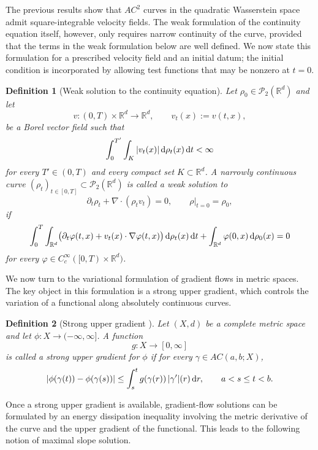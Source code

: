 \documentclass[11pt,reqno]{amsart}
\numberwithin{figure}{section}
\def\d {{\partial}}
\def\d{\mathrm{d}}
\renewcommand{\d}{  {\textup{d}} }
\newtheorem{definition}{Definition}[section]
\begin{document}
The previous results show that $AC^2$ curves in the quadratic Wasserstein space admit square-integrable velocity fields. The weak formulation of the continuity equation itself, however, only requires narrow continuity of the curve, provided that the terms in the weak formulation below are well defined. We now state this formulation for a prescribed velocity field and an initial datum; the initial condition is incorporated by allowing test functions that may be nonzero at $t=0$.

\begin{definition}[Weak solution to the continuity equation] \label{def:weak-solution} 
Let $\rho_0\in\mathcal P_2(\mathbb R^d)$ and let 
\[ v:(0,T)\times\mathbb R^d\to\mathbb R^d, \qquad v_t(x):=v(t,x), \] 
be a Borel vector field such that 
\[ \int_0^{T'}\int_K |v_t(x)|\,\d\rho_t(x)\,\d t<\infty \] 
for every $T'\in(0,T)$ and every compact set $K\subset\mathbb R^d$. A narrowly continuous curve $(\rho_t)_{t\in[0,T]}\subset\mathcal P_2(\mathbb R^d)$ is called a weak solution to 
\[ \partial_t\rho_t+\nabla\cdot(\rho_t v_t)=0, \qquad \rho|_{t=0}=\rho_0, \] 
if 
\[ \int_0^T\int_{\mathbb R^d} \bigl(\partial_t\varphi(t,x)+v_t(x)\cdot\nabla\varphi(t,x)\bigr)\, \d\rho_t(x)\,\d t + \int_{\mathbb R^d}\varphi(0,x)\,\d\rho_0(x)=0 \] 
for every $\varphi\in C_c^\infty([0,T)\times\mathbb R^d)$. \end{definition}

We now turn to the variational formulation of gradient flows in metric spaces. The key object in this formulation is a strong upper gradient, which controls the variation of a functional along absolutely continuous curves.

\begin{definition}[Strong upper gradient {\cite[Definition~1.2.1]{AGS2005}}]
	Let $(X,d)$ be a complete metric space and let $\phi:X\to(-\infty,\infty]$. A function
	\[
	g:X\to[0,\infty]
	\]
	is called a strong upper gradient for $\phi$ if for every $\gamma\in AC(a,b;X)$,
	\[
	|\phi(\gamma(t))-\phi(\gamma(s))|
	\le
	\int_s^t g(\gamma(r))\,|\gamma'|(r)\,\d r,
	\qquad
	a<s\le t<b.
	\]
\end{definition}

Once a strong upper gradient is available, gradient-flow solutions can be formulated by an energy dissipation inequality involving the metric derivative of the curve and the upper gradient of the functional. This leads to the following notion of maximal slope solution.
\end{document}
